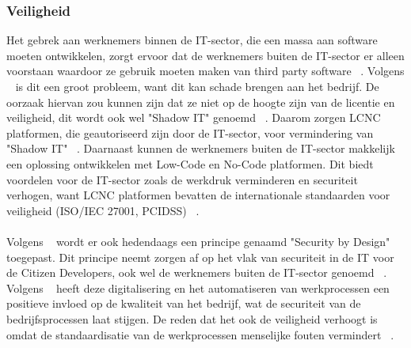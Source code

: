 \subsubsection{Veiligheid}
\label{subsec:veiligheid}
Het gebrek aan werknemers binnen de IT-sector, die een massa aan software moeten ontwikkelen, 
zorgt ervoor dat de werknemers buiten de IT-sector er alleen voorstaan waardoor ze gebruik moeten maken van third party software ~\autocite{Yan2021}. 
Volgens ~\textcite{Yan2021} is dit een groot probleem, want dit kan schade brengen aan het bedrijf. 
De oorzaak hiervan zou kunnen zijn dat ze niet op de hoogte zijn van de licentie en veiligheid, dit wordt ook wel "Shadow IT" genoemd 
~\autocite{Rokis_2022}. Daarom zorgen LCNC platformen, die geautoriseerd zijn door de IT-sector, voor vermindering van "Shadow IT" ~\autocite{Yan2021}. 
Daarnaast kunnen de werknemers buiten de IT-sector makkelijk een oplossing ontwikkelen met Low-Code en No-Code platformen.
Dit biedt voordelen voor de IT-sector zoals de werkdruk verminderen en securiteit verhogen, 
want LCNC platformen bevatten de internationale standaarden voor veiligheid (ISO/IEC 27001, PCIDSS) ~\autocite{Sufi_2023}.
\\
\\
Volgens ~\textcite{Sufi_2023} wordt er ook hedendaags een principe genaamd "Security by Design" toegepast. 
Dit principe neemt zorgen af op het vlak van securiteit in de IT voor de Citizen Developers, ook wel de werknemers buiten de IT-sector genoemd ~\autocite{Sufi_2023}. 
Volgens ~\textcite{Elshan2023} heeft deze digitalisering en het automatiseren van werkprocessen een positieve invloed op de kwaliteit van het bedrijf, wat 
de securiteit van de bedrijfsprocessen laat stijgen. De reden dat het ook de veiligheid verhoogt is omdat de standaardisatie van de werkprocessen menselijke fouten vermindert ~\autocite{Elshan2023}.
